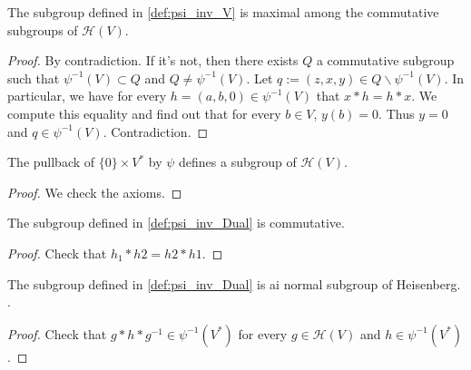 \begin{proposition}
    \label{prop:psi_inv_V_max}
    \leanok

    The subgroup defined in \ref{def:psi_inv_V} is maximal among the
    commutative subgroups of $\mathcal{H}(V)$.
\end{proposition}
\begin{proof}
    \leanok 
    By contradiction. If it's not, then there exists $Q$ a commutative subgroup
    such that $\psi^{-1}(V)\subset Q$ and $Q\ne \psi^{-1}(V)$. Let $q:=(z,x,y)\in Q\backslash \psi^{-1}(V)$.
    In particular, we have for every $h=(a,b,0)\in \psi^{-1}(V)$ that $x*h=h*x$.
    We compute this equality and find out that for every $b\in V$, $y(b)=0$. Thus $y=0$ and $q\in \psi^{-1}(V)$.
    Contradiction.
\end{proof}

\begin{definition}[$\psi^{-1}(V)$]
    \label{def:psi_inv_Dual}
    \leanok 

    The pullback of $\{0\}\times V^*$ by $\psi$ defines a subgroup of $\mathcal{H}(V)$.
    \begin{proof}
        \leanok
        We check the axioms.
    \end{proof}
\end{definition}
    
\begin{proposition}
    \label{prop:psi_inv_Dual_comm}
    \leanok

    The subgroup defined in \ref{def:psi_inv_Dual} is commutative.
\end{proposition}
\begin{proof}
    \leanok
    Check that $h_1*h2=h2*h1$.
\end{proof}

\begin{proposition}
    \label{prop:psi_inv_Dual_normal}
    \leanok

    The subgroup defined in \ref{def:psi_inv_Dual} is ai normal subgroup of Heisenberg. .
\end{proposition}
\begin{proof}
    \leanok 
    Check that $g*h*g^{-1}\in \psi^{-1}(V^*)$ for every $g\in \mathcal{H}(V)$ and $h\in \psi^{-1}(V^*)$.
\end{proof}

